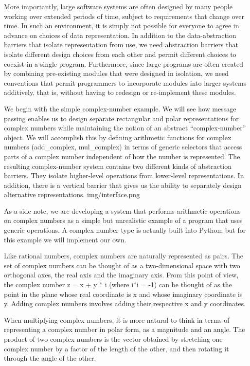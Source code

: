 \documentclass[letterpaper,10pt,dvipdfmx]{sphinxmanual}
\begin{document}
More importantly, large software systems are often designed by many people working over extended periods of time, subject to requirements that change over time. In such an environment, it is simply not possible for everyone to agree in advance on choices of data representation. In addition to the data-abstraction barriers that isolate representation from use, we need abstraction barriers that isolate different design choices from each other and permit different choices to coexist in a single program. Furthermore, since large programs are often created by combining pre-existing modules that were designed in isolation, we need conventions that permit programmers to incorporate modules into larger systems additively, that is, without having to redesign or re-implement these modules.

We begin with the simple complex-number example. We will see how message passing enables us to design separate rectangular and polar representations for complex numbers while maintaining the notion of an abstract ``complex-number'' object. We will accomplish this by defining arithmetic functions for complex numbers (add\_complex, mul\_complex) in terms of generic selectors that access parts of a complex number independent of how the number is represented. The resulting complex-number system contains two different kinds of abstraction barriers. They isolate higher-level operations from lower-level representations. In addition, there is a vertical barrier that gives us the ability to separately design alternative representations.
img/interface.png

As a side note, we are developing a system that performs arithmetic operations on complex numbers as a simple but unrealistic example of a program that uses generic operations. A complex number type is actually built into Python, but for this example we will implement our own.

Like rational numbers, complex numbers are naturally represented as pairs. The set of complex numbers can be thought of as a two-dimensional space with two orthogonal axes, the real axis and the imaginary axis. From this point of view, the complex number z = x + y * i (where i*i = -1) can be thought of as the point in the plane whose real coordinate is x and whose imaginary coordinate is y. Adding complex numbers involves adding their respective x and y coordinates.

When multiplying complex numbers, it is more natural to think in terms of representing a complex number in polar form, as a magnitude and an angle. The product of two complex numbers is the vector obtained by stretching one complex number by a factor of the length of the other, and then rotating it through the angle of the other.
\end{document}
